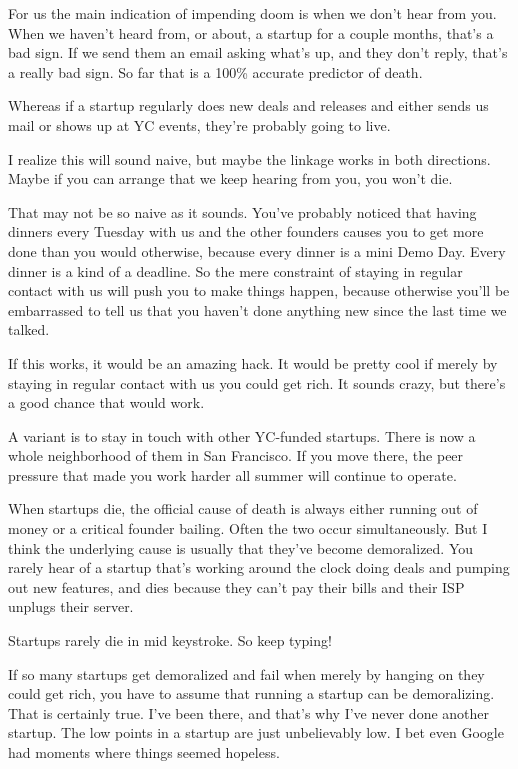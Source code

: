 For us the main indication of impending doom is when we don't hear from
you. When we haven't heard from, or about, a startup for a couple
months, that's a bad sign. If we send them an email asking what's up,
and they don't reply, that's a really bad sign. So far that is a 100\%
accurate predictor of death.

Whereas if a startup regularly does new deals and releases and either
sends us mail or shows up at YC events, they're probably going to live.

I realize this will sound naive, but maybe the linkage works in both
directions. Maybe if you can arrange that we keep hearing from you, you
won't die.

That may not be so naive as it sounds. You've probably noticed that
having dinners every Tuesday with us and the other founders causes you
to get more done than you would otherwise, because every dinner is a
mini Demo Day. Every dinner is a kind of a deadline. So the mere
constraint of staying in regular contact with us will push you to make
things happen, because otherwise you'll be embarrassed to tell us that
you haven't done anything new since the last time we talked.

If this works, it would be an amazing hack. It would be pretty cool if
merely by staying in regular contact with us you could get rich. It
sounds crazy, but there's a good chance that would work.

A variant is to stay in touch with other YC-funded startups. There is
now a whole neighborhood of them in San Francisco. If you move there,
the peer pressure that made you work harder all summer will continue to
operate.

When startups die, the official cause of death is always either running
out of money or a critical founder bailing. Often the two occur
simultaneously. But I think the underlying cause is usually that they've
become demoralized. You rarely hear of a startup that's working around
the clock doing deals and pumping out new features, and dies because
they can't pay their bills and their ISP unplugs their server.

Startups rarely die in mid keystroke. So keep typing!

If so many startups get demoralized and fail when merely by hanging on
they could get rich, you have to assume that running a startup can be
demoralizing. That is certainly true. I've been there, and that's why
I've never done another startup. The low points in a startup are just
unbelievably low. I bet even Google had moments where things seemed
hopeless.

